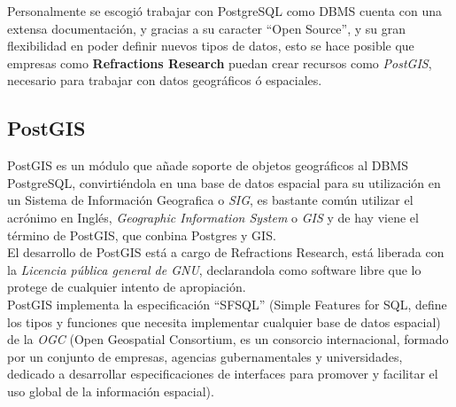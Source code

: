       Personalmente se escogió trabajar con  PostgreSQL como DBMS cuenta con una extensa documentación,  y gracias a su caracter ``Open Source'', y su gran flexibilidad en poder definir nuevos tipos de datos, esto se hace posible que empresas como \textbf{Refractions Research} puedan crear recursos como \emph{PostGIS}, necesario para trabajar con datos geográficos \'o espaciales.




    \subsection{PostGIS} %
    \label{sec:postgis}

      PostGIS es un módulo  que a\~nade soporte de objetos geográficos al DBMS PostgreSQL, convirtiéndola en una base de datos espacial para su utilización en un Sistema de Informaci\'on Geografica o \emph{SIG}, es bastante común utilizar el acrónimo en Inglés, \emph{Geographic Information System} o \emph{GIS} y de hay viene el término de PostGIS, que conbina Postgres y GIS.\\

      El desarrollo de PostGIS está a cargo de Refractions Research, está liberada con la \emph{Licencia pública general de GNU}, declarandola como software libre que lo protege de cualquier intento de apropiaci\'on.\\

      PostGIS implementa la especificaci\'on ``SFSQL'' (Simple Features for SQL, define los tipos y funciones que necesita implementar cualquier base de datos espacial) de la \emph{OGC} (Open Geospatial Consortium, es un consorcio internacional, formado por un conjunto de empresas, agencias gubernamentales y universidades, dedicado a desarrollar especificaciones de interfaces para promover y facilitar el uso global de la información espacial).\\

